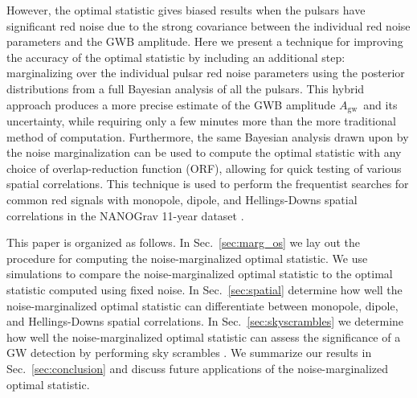 \documentclass[twocolumn,aps,prd,superscriptaddress]{revtex4-1}
\newcommand{\Agw}{\ensuremath{A_\mathrm{gw}}}
\begin{document}
However, the optimal statistic gives biased results 
when the pulsars have significant red noise 
due to the strong covariance between the individual red noise parameters 
and the GWB amplitude. 
Here we present a technique for improving the accuracy of the optimal statistic by including an additional step: 
marginalizing over the individual pulsar red noise parameters 
using the posterior distributions from a full Bayesian analysis of all the pulsars. 
This hybrid approach produces a more precise estimate of the GWB amplitude \Agw\ 
and its uncertainty, while requiring only a few minutes more than the more traditional method of computation. 
Furthermore, the same Bayesian analysis drawn upon by the noise marginalization 
can be used to compute the optimal statistic with any choice of overlap-reduction function (ORF), 
allowing for quick testing of various spatial correlations. 
This technique is used to perform the frequentist searches 
for common red signals with monopole, dipole, and Hellings-Downs spatial correlations 
in the NANOGrav 11-year dataset \citep{abb+17b}.

This paper is organized as follows. In Sec.~\ref{sec:marg_os} 
we lay out the procedure for computing the noise-marginalized optimal statistic. 
We use simulations to compare the noise-marginalized optimal statistic 
to the optimal statistic computed using fixed noise. 
In Sec.~\ref{sec:spatial} determine how well 
the noise-marginalized optimal statistic can 
differentiate between monopole, dipole, and Hellings-Downs spatial correlations. 
In Sec.~\ref{sec:skyscrambles} we determine how well the noise-marginalized optimal statistic 
can assess the significance of a GW detection by performing sky scrambles \citep{cs2016, tlb+2017}. 
We summarize our results in Sec.~\ref{sec:conclusion} 
and discuss future applications of the noise-marginalized optimal statistic.
\end{document}
